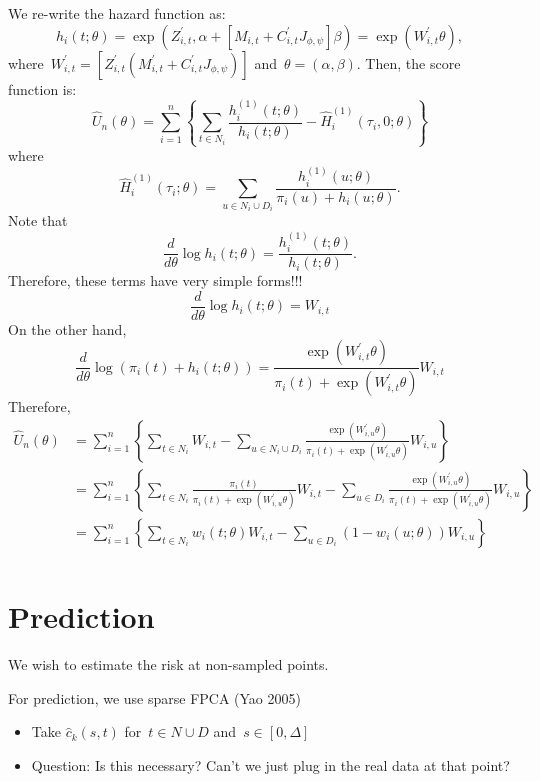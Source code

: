 \documentclass[11pt]{amsart}
\begin{document}
We re-write the hazard function as:
\[
h_i (t; \theta) = \exp \left( Z_{i,t}^\prime, \alpha + [M_{i,t} + C_{i,t}^\prime
  J_{\phi, \psi} ] \beta \right) = \exp \left( W_{i,t}^\prime \theta \right),
\]
where~$W_{i,t}^\prime = [ Z_{i,t}^\prime (M_{i,t}^\prime +
C_{i,t}^\prime J_{\phi, \psi}) ]$ and~$\theta = (\alpha,
\beta)$. Then, the score function is:
\[
\hat U_n (\theta) = \sum_{i=1}^n \left \{  \sum_{t \in N_i}
  \frac{h_i^{(1)} (t; \theta)}{h_i (t; \theta)} - \hat H_i^{(1)}
  (\tau_i, 0; \theta) 
\right \}
\]
where
\[
\hat H_i^{(1)} (\tau_i; \theta) = \sum_{u \in N_i \cup D_i} \frac{
  h^{(1)}_i (u; \theta)}{\pi_i (u) + h_i (u; \theta)}.
\]
Note that
\[
\frac{d}{d\theta} \log h_i (t; \theta) = \frac{h^{(1)}_i (t;
  \theta)}{h_i (t; \theta)}.
\]
Therefore, these terms have very simple forms!!! 
\[
\frac{d}{d\theta} \log h_i (t; \theta) = W_{i,t}
\]
On the other hand,
\[
\frac{d}{d \theta} \log \left( \pi_i (t) + h_i (t;\theta) \right) = 
\frac{\exp \left( W_{i,t}^\prime \theta \right)}{\pi_i (t) + \exp
  \left( W_{i,t}^\prime \theta \right)} W_{i,t}
\]
Therefore,
\begin{align*}
\hat U_n (\theta) 
  &= \sum_{i=1}^n \left \{ \sum_{t \in N_i} W_{i,t} -
    \sum_{u \in N_i \cup D_i} \frac{\exp \left( W_{i,u}^\prime \theta
    \right)}{\pi_i (t) + \exp \left( W_{i,u}^\prime \theta \right)}
    W_{i,u} \right \} \\
  &= \sum_{i=1}^n \left \{ \sum_{t \in N_i} \frac{\pi_i (t)}{\pi_i (t)
    + \exp \left( W_{i,u}^\prime \theta \right)} W_{i,t} -
    \sum_{u \in D_i} \frac{\exp \left( W_{i,u}^\prime \theta
    \right)}{\pi_i (t) + \exp \left( W_{i,u}^\prime \theta \right)}
    W_{i,u} \right \} \\
  &= \sum_{i=1}^n \left \{ \sum_{t \in N_i} w_{i} (t; \theta) W_{i,t} -
    \sum_{u \in D_i} (1 - w_i (u; \theta)) W_{i,u} \right \} \\
\end{align*}


\section{Prediction}
We wish to estimate the risk at non-sampled points.

For prediction, we use sparse FPCA (Yao 2005) 
\begin{itemize}
\item Take $\hat c_{k} (s,t)$ for~$t \in N \cup D$ and~$s \in
  [0,\Delta]$
\item Question: Is this necessary?  Can't we just plug in the real
  data at that point?
\end{itemize}
\end{document}
